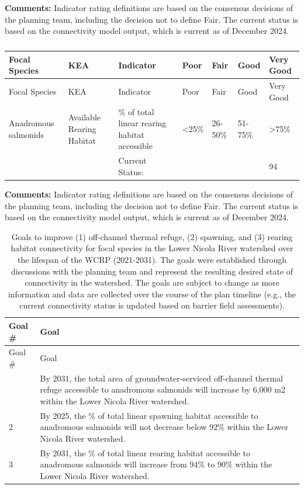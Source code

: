 \documentclass[
  letterpaper,
  DIV=11,
  numbers=noendperiod]{scrreprt}
\begin{document}
\textbf{Comments:} Indicator rating definitions are based on the
consensus decisions of the planning team, including the decision not to
define Fair. The current status is based on the connectivity model
output, which is current as of December 2024.

\begin{longtable}[]{@{}lllllll@{}}
\caption{}\label{T_6b1ff}\tabularnewline
\toprule\noalign{}
Focal Species & KEA & Indicator & Poor & Fair & Good & Very Good \\
\midrule\noalign{}
\endfirsthead
\toprule\noalign{}
Focal Species & KEA & Indicator & Poor & Fair & Good & Very Good \\
\midrule\noalign{}
\endhead
\bottomrule\noalign{}
\endlastfoot
Anadromous salmonids & Available Rearing Habitat & \% of total linear
rearing habitat accessible & \textless25\% & 26-50\% & 51-75\% &
\textgreater75\% \\
& & Current Status: & & & & 94 \\
\end{longtable}

\textbf{Comments:} Indicator rating definitions are based on the
consensus decisions of the planning team, including the decision not to
define Fair. The current status is based on the connectivity model
output, which is current as of December 2024.

\hypertarget{tbl-goals}{}
\begin{longtable}[]{@{}ll@{}}
\caption{\label{tbl-goals}Goals to improve (1) off-channel thermal
refuge, (2) spawning, and (3) rearing habitat connectivity for focal
species in the Lower Nicola River watershed over the lifespan of the
WCRP (2021-2031). The goals were established through discussions with
the planning team and represent the resulting desired state of
connectivity in the watershed. The goals are subject to change as more
information and data are collected over the course of the plan timeline
(e.g., the current connectivity status is updated based on barrier field
assessments).}\label{T_1717d}\tabularnewline
\toprule\noalign{}
Goal \# & Goal \\
\midrule\noalign{}
\endfirsthead
\toprule\noalign{}
Goal \# & Goal \\
\midrule\noalign{}
\endhead
\bottomrule\noalign{}
\endlastfoot
1 & By 2031, the total area of groundwater-serviced off-channel thermal
refuge accessible to anadromous salmonids will increase by 6,000 m2
within the Lower Nicola River watershed. \\
2 & By 2025, the \% of total linear spawning habitat accessible to
anadromous salmonids will not decrease below 92\% within the Lower
Nicola River watershed. \\
3 & By 2031, the \% of total linear rearing habitat accessible to
anadromous salmonids will increase from 94\% to 90\% within the Lower
Nicola River watershed. \\
\end{longtable}
\end{document}
